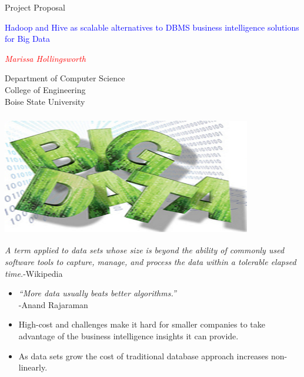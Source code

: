 \documentclass[hyperref={pdfpagelabels=false}]{beamer}
\begin{document}
\begin{frame}
\begin{center}

{\Large
Project Proposal\\
}
\bigskip
\bigskip

\textcolor{blue}
{\Large
Hadoop and Hive as scalable alternatives to DBMS business intelligence solutions
for Big Data
}

\bigskip
\bigskip

\textcolor{red}
{\large\em
Marissa Hollingsworth
}

\medskip

{\small
Department of Computer Science\\
College of Engineering\\
Boise State University
}

\end{center}
\end{frame}

\begin{frame}
\frametitle{\hspace{.35\textwidth} \includegraphics[height=.75in,
keepaspectratio=true]{./images/big-data.jpg}}

{\it A term applied to data sets whose size is beyond
the ability of commonly used software tools to capture, manage, and process the
data within a tolerable elapsed time.}\hspace{1in}-Wikipedia\\
\bigskip
\pause
\begin{itemize}
 \item {\it ``More data usually beats better algorithms.''}\\
	\hspace{.6\textwidth}-Anand Rajaraman
  \pause
 \item High-cost and challenges make it hard for smaller companies to take
       advantage of the business intelligence insights it can provide.
  \pause
 \item As data sets grow the cost of traditional database approach increases
       non-linearly.
\end{itemize}



\end{frame}
\end{document}
